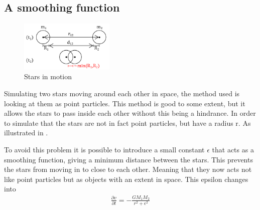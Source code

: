 \subsection{A smoothing function}
\begin{figure}
\begin{center}
\includegraphics[width = 0.4\textwidth]{Figures/argument_for_epsilon.png}
\end{center}
\caption{Stars in motion}
\label{fig:afeps}
\end{figure}

Simulating two stars moving around each other in space, the method used is looking at them as point particles. This method is good to some extent, but it allows the stars to pass inside each other without this being a hindrance. In order to simulate that the stars are not in fact point particles, but have a radius r. As illustrated in .  

To avoid this problem it is possible to introduce a small constant $\epsilon$ that acts as a smoothing function, giving a minimum distance between the stars. This prevents the stars from moving in to close to each other. Meaning that they now acts not like point particles but as objects with an extent in space. This epsilon changes  into 
\begin{align}
 \frac{\partial v}{\partial t} = -\frac{GM_1M_2}{r^2 + \epsilon^2}
\end{align}




